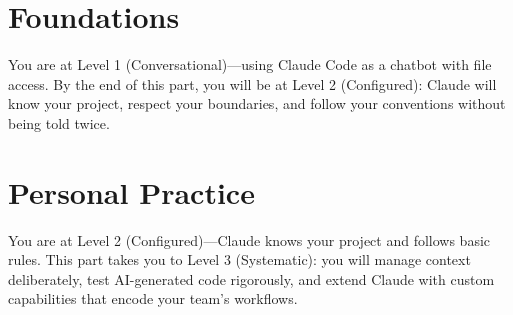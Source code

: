 \documentclass[10pt,oneside,open=any]{scrbook}
\begin{document}
\makeguidecover

\frontmatter
\hypersetup{pageanchor=false}
\tableofcontents
\mainmatter
\hypersetup{pageanchor=true}



\part{Foundations}
\label{part:foundations}

\begin{partintro}
You are at Level 1 (Conversational)---using Claude Code as a chatbot with file access.
By the end of this part, you will be at Level 2 (Configured):
Claude will know your project, respect your boundaries, and follow your conventions
without being told twice.
\end{partintro}







\part{Personal Practice}
\label{part:practice}

\begin{partintro}
You are at Level 2 (Configured)---Claude knows your project and follows basic rules.
This part takes you to Level 3 (Systematic): you will manage context deliberately,
test AI-generated code rigorously, and extend Claude with custom capabilities
that encode your team's workflows.
\end{partintro}






\end{document}
